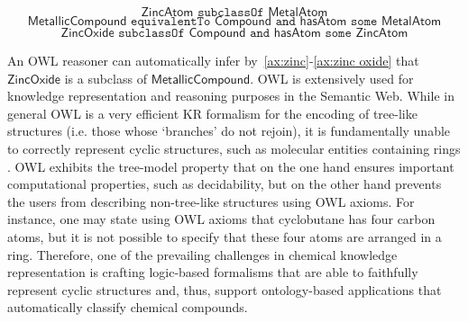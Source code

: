 \documentclass[10pt]{bmc_article}
\newenvironment{bmcformat}{\baselineskip20pt\sloppy\setboolean{publ}{false}}{\baselineskip20pt\sloppy}
\begin{document}
\begin{bmcformat}
\begin{equation} \label{ax:zinc}\mathsf{ZincAtom} \texttt{ subclassOf } \mathsf{MetalAtom}\end{equation} 
\begin{equation}\label{ax:metallic compound}\mathsf{MetallicCompound} \texttt{ equivalentTo } \mathsf{Compound} \texttt{ and } \mathsf{hasAtom} \texttt{ some } \mathsf{MetalAtom}\end{equation}
\begin{equation}\label{ax:zinc oxide} \mathsf{ZincOxide} \texttt{ subclassOf } \mathsf{Compound} \texttt{ and } \mathsf{hasAtom}  \texttt{ some } \mathsf{ZincAtom}\end{equation} 
 
An OWL reasoner can automatically infer by~\eqref{ax:zinc}-\eqref{ax:zinc oxide}  that $\mathsf{ZincOxide}$ is a subclass of $\mathsf{MetallicCompound}$.
OWL is extensively used for knowledge representation and reasoning purposes in the Semantic Web. %
While in general OWL is a very efficient KR formalism for the encoding of tree-like structures (i.e. those whose `branches' do not rejoin), it is fundamentally unable to correctly represent cyclic structures, such as molecular entities containing rings \cite{magka2011}.
OWL exhibits the tree-model property \cite{VardiModalLogic} that on the one hand ensures important computational properties, such as decidability, but on the other hand prevents the users from describing non-tree-like structures using OWL axioms. For instance, one may state using OWL axioms that cyclobutane has four carbon atoms, but it is not possible to specify that these four atoms are arranged in a ring. Therefore, one of the prevailing challenges in chemical knowledge representation is crafting logic-based formalisms that are able to faithfully represent cyclic structures and, thus, support ontology-based applications that automatically classify chemical compounds.


\end{bmcformat}
\end{document}
